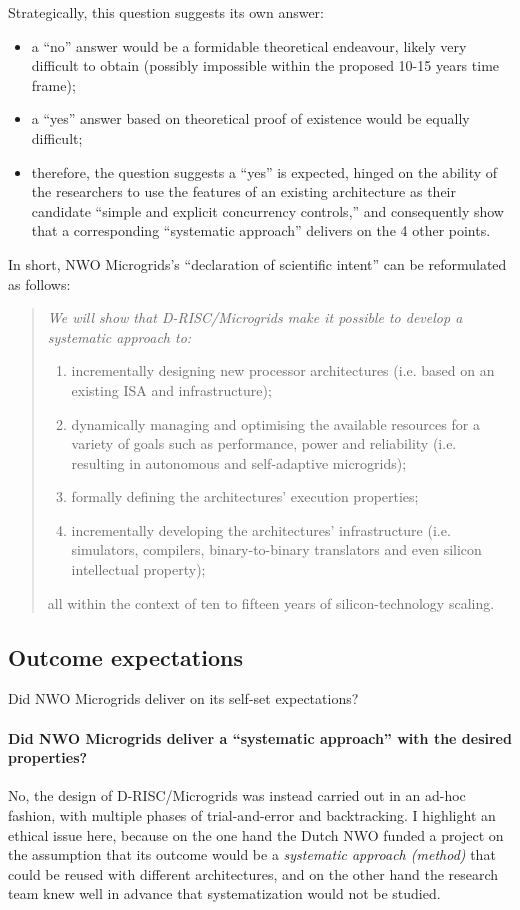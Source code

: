Strategically, this question suggests its own answer:
\begin{itemize}
\item a ``no'' answer would be a formidable theoretical endeavour, likely very
difficult to obtain (possibly impossible within the proposed 10-15
years time frame);
\item a ``yes'' answer based on theoretical proof of existence would be equally difficult;
\item therefore, the question suggests a ``yes'' is expected, hinged
  on the ability of the researchers to use the features of an existing
  architecture as their candidate ``simple and explicit concurrency
  controls,'' and consequently show that a corresponding ``systematic
  approach'' delivers on the 4 other points.
\end{itemize}

In short, NWO Microgrids's ``declaration of scientific intent'' can be reformulated as follows:

\begin{quote} \itshape
We will show that D-RISC/Microgrids make it possible to develop a systematic approach to:
\begin{enumerate}
\item incrementally designing new processor architectures (i.e. based on an existing ISA and infrastructure);
\item dynamically managing and optimising the available resources for a variety of goals such as performance, power and reliability (i.e. resulting in autonomous and self-adaptive microgrids);
\item formally defining the architectures' execution properties; 
\item incrementally developing the architectures' infrastructure (i.e. simulators, compilers, binary-to-binary translators and even silicon intellectual property); 
\end{enumerate}
all within the context of ten to fifteen years of silicon-technology scaling.
\end{quote}

\subsection{Outcome \vs expectations}

Did NWO Microgrids deliver on its self-set expectations?

\paragraph{Did NWO Microgrids deliver a ``systematic approach'' with the desired properties?} No, the design of D-RISC/Microgrids
was instead carried out in an ad-hoc fashion, with multiple phases of
trial-and-error and backtracking. I highlight an ethical issue here,
because on the one hand the Dutch NWO funded a project on the
assumption that its outcome would be a \emph{systematic approach
  (method)} that could be reused with different architectures, and on
the other hand the research team knew well in
advance that systematization would not be studied.

